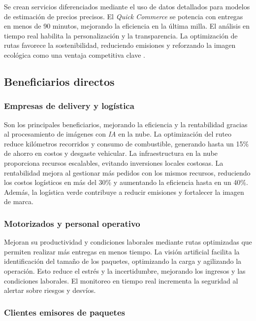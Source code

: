 Se crean servicios diferenciados mediante el uso de datos detallados para modelos de estimación de precios precisos. El \textit{Quick Commerce} se potencia con entregas en menos de 90 minutos, mejorando la eficiencia en la última milla. El análisis en tiempo real habilita la personalización y la transparencia. La optimización de rutas favorece la sostenibilidad, reduciendo emisiones y reforzando la imagen ecológica como una ventaja competitiva clave \cite{WebRef132364}.


\subsection{Beneficiarios directos}

\subsubsection{Empresas de delivery y logística}

Son los principales beneficiarios, mejorando la eficiencia y la rentabilidad gracias al procesamiento de imágenes con \textit{IA} en la nube. La optimización del ruteo reduce kilómetros recorridos y consumo de combustible, generando hasta un 15\% de ahorro en costos y desgaste vehicular. La infraestructura en la nube proporciona recursos escalables, evitando inversiones locales costosas. La rentabilidad mejora al gestionar más pedidos con los mismos recursos, reduciendo los costos logísticos en más del 30\% y aumentando la eficiencia hasta en un 40\%. Además, la logística verde contribuye a reducir emisiones y fortalecer la imagen de marca.

\subsubsection{Motorizados y personal operativo}

Mejoran su productividad y condiciones laborales mediante rutas optimizadas que permiten realizar más entregas en menos tiempo. La visión artificial facilita la identificación del tamaño de los paquetes, optimizando la carga y agilizando la operación. Esto reduce el estrés y la incertidumbre, mejorando los ingresos y las condiciones laborales. El monitoreo en tiempo real incrementa la seguridad al alertar sobre riesgos y desvíos.

\subsubsection{Clientes emisores de paquetes}

